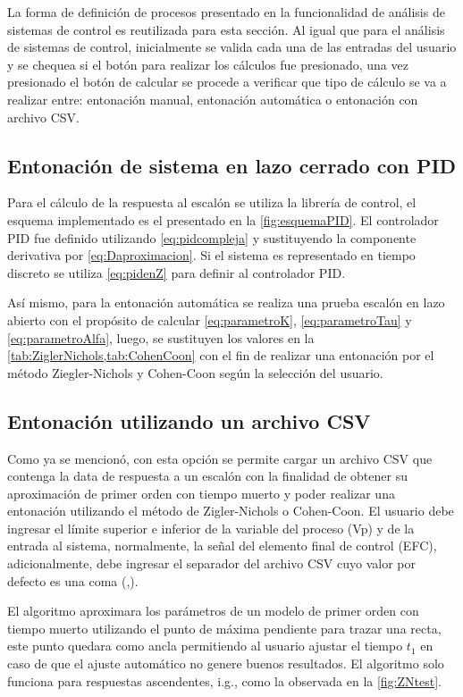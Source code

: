     La forma de definición de procesos presentado en la funcionalidad de análisis de sistemas de control es reutilizada para esta sección. Al igual que para el análisis de sistemas de control, inicialmente se valida cada una de las entradas del usuario y se chequea si el botón para realizar los cálculos fue presionado, una vez presionado el botón de calcular se procede a verificar que tipo de cálculo se va a realizar entre: entonación manual, entonación automática o entonación con archivo CSV.

    \subsection{Entonación de sistema en lazo cerrado con PID}
        
        Para el cálculo de la respuesta al escalón se utiliza la librería de control, el esquema implementado es el presentado en la \cref{fig:esquemaPID}. El controlador PID fue definido utilizando \cref{eq:pidcompleja} y sustituyendo la componente derivativa por \cref{eq:Daproximacion}. Si el sistema es representado en tiempo discreto se utiliza \cref{eq:pidenZ} para definir al controlador PID.
        
        Así mismo, para la entonación automática se realiza una prueba escalón en lazo abierto con el propósito de calcular \cref{eq:parametroK}, \cref{eq:parametroTau} y \cref{eq:parametroAlfa}, luego, se sustituyen los valores en la \cref{tab:ZiglerNichols,tab:CohenCoon} con el fin de realizar una entonación por el método Ziegler-Nichols y Cohen-Coon según la selección del usuario.

    \subsection{Entonación utilizando un archivo CSV}

        Como ya se mencionó, con esta opción se permite cargar un archivo CSV que contenga la data de respuesta a un escalón con la finalidad de obtener su aproximación de primer orden con tiempo muerto y poder realizar una entonación utilizando el método de Zigler-Nichols o Cohen-Coon. El usuario debe ingresar el límite superior e inferior de la variable del proceso (Vp) y de la entrada al sistema, normalmente, la señal del elemento final de control (EFC), adicionalmente, debe ingresar el separador del archivo CSV cuyo valor por defecto es una coma (,).

        El algoritmo aproximara los parámetros de un modelo de primer orden con tiempo muerto utilizando el punto de máxima pendiente para trazar una recta, este punto quedara como ancla permitiendo al usuario ajustar el tiempo $t_1$ en caso de que el ajuste automático no genere buenos resultados. El algoritmo solo funciona para respuestas ascendentes, i.g., como la observada en la \cref{fig:ZNtest}.

